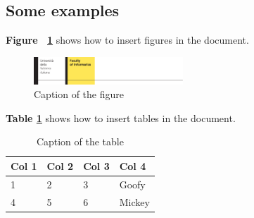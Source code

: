 \subsection {Some examples}

\textbf{Figure ~\ref{fig:USILogo}} shows how to insert figures in the document.

\begin{figure} [h]
\centering
\includegraphics[width=0.5\textwidth]{Other/logo-info.pdf}
\caption{Caption of the figure}
\label{fig:USILogo}
\end{figure}

\noindent\textbf{Table \ref{tab:numbers}} shows how to insert tables in the document.

\begin{table}[h]
\centering
{} {
\begin{normalsize}\begin{tabular}{l|lll}
\textbf{Col 1} & \textbf{Col 2} & \textbf{Col 3} & \textbf{Col 4}\\
\hline
1 & 2 & 3 & Goofy\\
4 & 5 & 6 & Mickey
\end{tabular}
\end{normalsize}
}
\caption{Caption of the table}
\label{tab:numbers}
\end{table}
